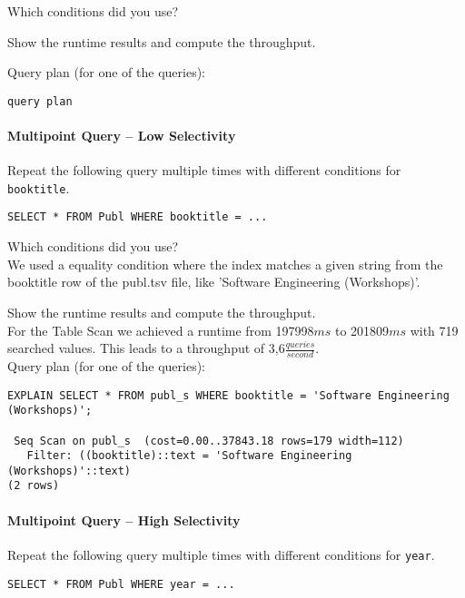 \documentclass[11pt]{scrartcl}
\begin{document}
\noindent
Which conditions did you use?

\smallskip\noindent
Show the runtime results and compute the throughput.

\smallskip\noindent
Query plan (for one of the queries):
{\small
\begin{verbatim}
query plan
\end{verbatim}
}


\paragraph{Multipoint Query -- Low Selectivity}

Repeat the following query multiple times with different conditions for {\tt booktitle}.

{\small
\begin{verbatim}
SELECT * FROM Publ WHERE booktitle = ...
\end{verbatim}
}

\noindent
Which conditions did you use?\\
We used a equality condition where the index matches a given string from the booktitle row of the publ.tsv file, like 'Software Engineering (Workshops)'.

\smallskip\noindent
Show the runtime results and compute the throughput.\\
For the Table Scan we achieved a runtime from 197998$ms$ to 201809$ms$ with 719 searched values.
This leads to a throughput of 3,6$\frac{queries}{second}$.\\

\smallskip\noindent
Query plan (for one of the queries):
\begin{verbatim}
EXPLAIN SELECT * FROM publ_s WHERE booktitle = 'Software Engineering (Workshops)';

 Seq Scan on publ_s  (cost=0.00..37843.18 rows=179 width=112)
   Filter: ((booktitle)::text = 'Software Engineering (Workshops)'::text)
(2 rows)
\end{verbatim}


\paragraph{Multipoint Query -- High Selectivity}

Repeat the following query multiple times with different conditions for {\tt year}.

{\small
\begin{verbatim}
SELECT * FROM Publ WHERE year = ...
\end{verbatim}
}
\end{document}
